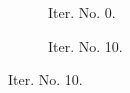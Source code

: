 \documentclass[a4paper,12pt]{amsart}
\numberwithin{equation}{section}
\begin{document}
\begin{figure}[h!]
\centering
\begin{subfigure}[t]{0.49\textwidth}
    \caption{Iter. No. 0.}
\end{subfigure}
	\hfill
\begin{subfigure}[t]{0.49\textwidth}
    \caption{Iter. No. 10.}
\end{subfigure}


\end{figure}
\end{document}
